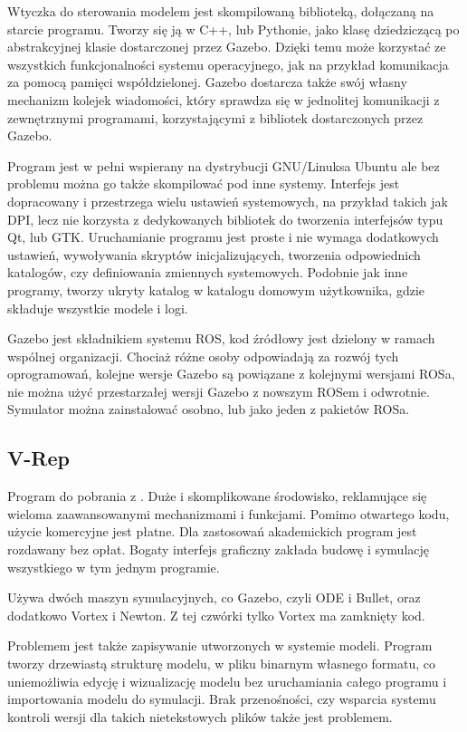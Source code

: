 	Wtyczka do sterowania modelem jest skompilowaną biblioteką, dołączaną na starcie programu.
	Tworzy się ją w C++, lub Pythonie, jako klasę dziedziczącą po abstrakcyjnej klasie dostarczonej przez Gazebo.
	Dzięki temu może korzystać ze wszystkich funkcjonalności systemu operacyjnego, jak na przykład komunikacja za pomocą pamięci współdzielonej.
	Gazebo dostarcza także swój własny mechanizm kolejek wiadomości, który sprawdza się w jednolitej komunikacji z zewnętrznymi programami, korzystającymi z bibliotek 
	dostarczonych przez Gazebo.

	Program jest w pełni wspierany na dystrybucji GNU/Linuksa Ubuntu ale bez problemu można go także skompilować pod inne systemy.
	Interfejs jest dopracowany i przestrzega wielu ustawień systemowych, na przykład takich jak DPI, lecz nie korzysta z dedykowanych bibliotek do tworzenia 
	interfejsów typu Qt, lub GTK.
	Uruchamianie programu jest proste i nie wymaga dodatkowych ustawień, wywoływania skryptów inicjalizujących, 
	tworzenia odpowiednich katalogów, czy definiowania zmiennych systemowych.
	Podobnie jak inne programy, tworzy ukryty katalog w katalogu domowym użytkownika, gdzie składuje wszystkie modele i logi.

	Gazebo jest składnikiem systemu ROS, kod źródłowy jest dzielony w ramach wspólnej organizacji.
	Chociaż różne osoby odpowiadają za rozwój tych oprogramowań,
	kolejne wersje Gazebo są powiązane z kolejnymi wersjami ROSa, nie można użyć przestarzałej wersji Gazebo z nowszym ROSem i odwrotnie.
	Symulator można zainstalować osobno, lub jako jeden z pakietów ROSa.

	\subsection{V-Rep}
	Program do pobrania z \cite{vrep_website}. Duże i skomplikowane środowisko, reklamujące się wieloma zaawansowanymi mechanizmami i funkcjami.
	Pomimo otwartego kodu, użycie komercyjne jest płatne. Dla zastosowań akademickich program jest rozdawany bez opłat.
	Bogaty interfejs graficzny zakłada budowę i symulację wszystkiego w tym jednym programie.

	Używa dwóch maszyn symulacyjnych, co Gazebo, czyli ODE i Bullet, oraz dodatkowo Vortex i Newton. Z tej czwórki tylko Vortex ma zamknięty kod.

	Problemem jest także zapisywanie utworzonych w systemie modeli.
	Program tworzy drzewiastą strukturę modelu, w pliku binarnym własnego formatu, co uniemożliwia edycję i wizualizację modelu bez uruchamiania całego programu 
	i importowania modelu do symulacji.
	Brak przenośności, czy wsparcia systemu kontroli wersji dla takich nietekstowych plików także jest problemem.

